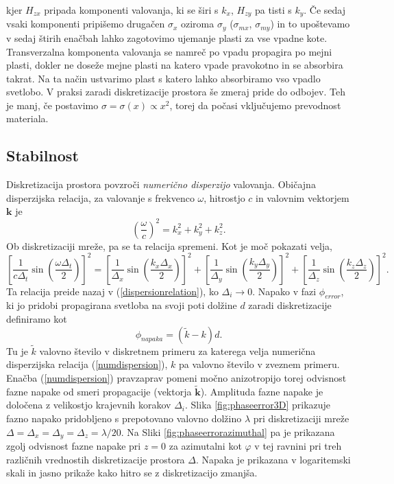 \documentclass[longbibliography,slovene,a4paper,12pt]{book}
\begin{document}
kjer $H_{zx}$ pripada komponenti valovanja, ki se širi s $k_x$, $H_{zy}$ pa tisti s $k_y$.
Če sedaj vsaki komponenti pripišemo drugačen $\sigma_x$ oziroma $\sigma_y$ ($\sigma_{mx}$, $\sigma_{my}$) in to upoštevamo v sedaj štirih enačbah lahko zagotovimo ujemanje plasti za vse vpadne kote. Transverzalna komponenta valovanja se namreč po vpadu propagira po mejni plasti, dokler ne doseže mejne plasti na katero vpade pravokotno in se absorbira takrat. Na ta način ustvarimo plast s katero lahko absorbiramo vso vpadlo svetlobo. V praksi zaradi diskretizacije prostora še zmeraj pride do odbojev. Teh je manj, če postavimo $\sigma = \sigma(x) \propto x^2$, torej da počasi vključujemo prevodnost materiala.

\subsection{Stabilnost}

Diskretizacija prostora povzroči \emph{numerično disperzijo} valovanja. Običajna disperzijska relacija, za valovanje s frekvenco $\omega$, hitrostjo $c$ in valovnim vektorjem $\mathbf{k}$ je
\begin{equation}
\left ( \frac{\omega}{c} \right )^2 = k_x^2 + k_y^2 +k_z^2.
\label{dispersionrelation}
\end{equation}
Ob diskretizaciji mreže, pa se ta relacija spremeni. Kot je moč pokazati velja,
\begin{equation}
\left [\frac{1}{c\Delta_t} \sin \left (\frac{\omega \Delta_t}{2} \right ) \right ]^2 = \left [\frac{1}{\Delta_x} \sin \left (\frac{k_x \Delta_x}{2} \right ) \right ]^2 + \left [\frac{1}{\Delta_y} \sin \left (\frac{k_y \Delta_y}{2} \right ) \right ]^2 + \left [\frac{1}{\Delta_z} \sin \left (\frac{k_z \Delta_z}{2} \right ) \right ]^2.
\label{numdispersion}
\end{equation}
Ta relacija preide nazaj v (\ref{dispersionrelation}), ko $\Delta_i \rightarrow 0$. Napako v fazi $\phi_{error}$, ki jo pridobi propagirana svetloba na svoji poti dolžine $d$ zaradi diskretizacije definiramo kot
\begin{equation}
\phi_{napaka} = (\tilde{k} - k)d.
\end{equation}
Tu je $\tilde{k}$ valovno število v diskretnem primeru za katerega velja numerična disperzijska relacija (\ref{numdispersion}), $k$ pa valovno število v zveznem primeru. Enačba (\ref{numdispersion}) pravzaprav pomeni močno anizotropijo torej odvisnost fazne napake od smeri propagacije (vektorja $\mathbf{\tilde{k}}$). Amplituda fazne napake je določena z velikostjo krajevnih korakov $\Delta_i$. Slika \ref{fig:phaseerror3D} prikazuje fazno napako pridobljeno s prepotovano valovno dolžino $\lambda$ pri diskretizaciji mreže $\Delta = \Delta_x = \Delta_y = \Delta_z = \lambda/20$. Na Sliki \ref{fig:phaseerrorazimuthal} pa je prikazana zgolj odvisnost fazne napake pri $z=0$ za azimutalni kot $\varphi$ v tej ravnini pri treh različnih vrednostih diskretizacije prostora $\Delta$. Napaka je prikazana v logaritemski skali in jasno prikaže kako hitro se z diskretizacijo zmanjša.
\end{document}
